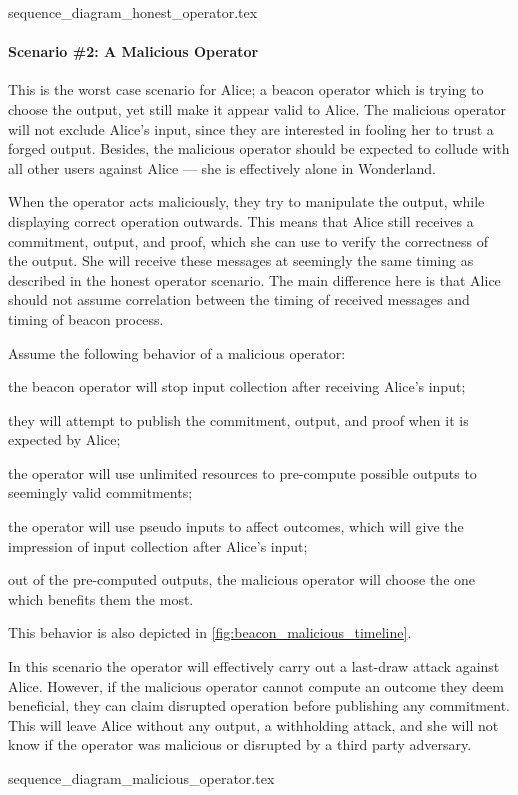 {sequence_diagram_honest_operator.tex}

\paragraph{Scenario \#2: A Malicious Operator}
This is the worst case scenario for Alice; a beacon operator which is trying to choose the output, yet still make it appear valid to Alice.
The malicious operator will not exclude Alice's input, since they are interested in fooling her to trust a forged output.
Besides, the malicious operator should be expected to collude with all other users against Alice --- she is effectively alone in Wonderland.

When the operator acts maliciously, they try to manipulate the output, while displaying correct operation outwards.
This means that Alice still receives a commitment, output, and proof, which she can use to verify the correctness of the output.
She will receive these messages at seemingly the same timing as described in the honest operator scenario.
The main difference here is that Alice should not assume correlation between the timing of received messages and timing of beacon process.

Assume the following behavior of a malicious operator:
\begin{eletterate*}
\item the beacon operator will stop input collection after receiving Alice's input;
\item they will attempt to publish the commitment, output, and proof when it is expected by Alice;
\item the operator will use unlimited resources to pre-compute possible outputs to seemingly valid commitments;
\item the operator will use pseudo inputs to affect outcomes, which will give the impression of input collection after Alice's input;
\item out of the pre-computed outputs, the malicious operator will choose the one which benefits them the most.
\end{eletterate*}
This behavior is also depicted in \cref{fig:beacon_malicious_timeline}.

In this scenario the operator will effectively carry out a last-draw attack against Alice.
However, if the malicious operator cannot compute an outcome they deem beneficial, they can claim disrupted operation before publishing any commitment.
This will leave Alice without any output, a withholding attack, and she will not know if the operator was malicious or disrupted by a third party adversary.

{sequence_diagram_malicious_operator.tex}
